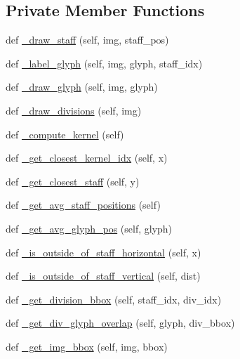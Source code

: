 \subsection*{Private Member Functions}
\begin{DoxyCompactItemize}
\item 
def \hyperlink{classautoscore_1_1musicdata_1_1MusicFile_a7411836aaa439e6ab795c9eb6f2dafda}{\+\_\+draw\+\_\+staff} (self, img, staff\+\_\+pos)
\item 
def \hyperlink{classautoscore_1_1musicdata_1_1MusicFile_abbe95f06e14d7e97c694414f281e44cd}{\+\_\+label\+\_\+glyph} (self, img, glyph, staff\+\_\+idx)
\item 
def \hyperlink{classautoscore_1_1musicdata_1_1MusicFile_aac385dcb7def5ed85eaac5fb08985210}{\+\_\+draw\+\_\+glyph} (self, img, glyph)
\item 
def \hyperlink{classautoscore_1_1musicdata_1_1MusicFile_ad83e796420aa4701e1b497fec4f2ecb5}{\+\_\+draw\+\_\+divisions} (self, img)
\item 
def \hyperlink{classautoscore_1_1musicdata_1_1MusicFile_ad54812ac793e700dbe0570dc12a1745f}{\+\_\+compute\+\_\+kernel} (self)
\item 
def \hyperlink{classautoscore_1_1musicdata_1_1MusicFile_a70d2bce8fdf26136887e2ca720c5a810}{\+\_\+get\+\_\+closest\+\_\+kernel\+\_\+idx} (self, x)
\item 
def \hyperlink{classautoscore_1_1musicdata_1_1MusicFile_adc96239a541410c708e98db12f1b0641}{\+\_\+get\+\_\+closest\+\_\+staff} (self, y)
\item 
def \hyperlink{classautoscore_1_1musicdata_1_1MusicFile_a3a594bff10c7b6b2a755ffac9fc196bc}{\+\_\+get\+\_\+avg\+\_\+staff\+\_\+positions} (self)
\item 
def \hyperlink{classautoscore_1_1musicdata_1_1MusicFile_ab7e9ab7aa696a152a6bc0f1a4b46df75}{\+\_\+get\+\_\+avg\+\_\+glyph\+\_\+pos} (self, glyph)
\item 
def \hyperlink{classautoscore_1_1musicdata_1_1MusicFile_a0d1006363eaac6fbf75b2beb70652823}{\+\_\+is\+\_\+outside\+\_\+of\+\_\+staff\+\_\+horizontal} (self, x)
\item 
def \hyperlink{classautoscore_1_1musicdata_1_1MusicFile_a2b5ce70f1b4e7c72090eb6d0491f181d}{\+\_\+is\+\_\+outside\+\_\+of\+\_\+staff\+\_\+vertical} (self, dist)
\item 
def \hyperlink{classautoscore_1_1musicdata_1_1MusicFile_aa996a6554c06aa260115e069b142a479}{\+\_\+get\+\_\+division\+\_\+bbox} (self, staff\+\_\+idx, div\+\_\+idx)
\item 
def \hyperlink{classautoscore_1_1musicdata_1_1MusicFile_a9d03b6fdec799a863fa9d4fee1ac26a7}{\+\_\+get\+\_\+div\+\_\+glyph\+\_\+overlap} (self, glyph, div\+\_\+bbox)
\item 
def \hyperlink{classautoscore_1_1musicdata_1_1MusicFile_a5d5f4d1e7fd24f688cc79e54b43e0e96}{\+\_\+get\+\_\+img\+\_\+bbox} (self, img, bbox)
\end{DoxyCompactItemize}


